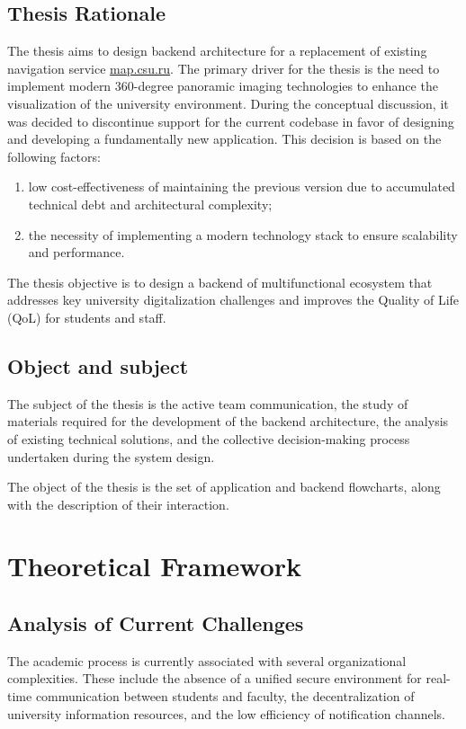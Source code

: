 \documentclass[a4paper, 14pt]{extreport}
\begin{document}
\section{Thesis Rationale}
The thesis aims to design backend architecture for a replacement of existing navigation service \href{https://map.csu.ru}{map.csu.ru}. The primary driver for the thesis is the need to implement modern 360-degree panoramic imaging technologies to enhance the visualization of the university environment. During the conceptual discussion, it was decided to discontinue support for the current codebase in favor of designing and developing a fundamentally new application. This decision is based on the following factors:
\begin{enumerate}
	\item low cost-effectiveness of maintaining the previous version due to accumulated technical debt and architectural complexity;
	\item the necessity of implementing a modern technology stack to ensure scalability and performance.
\end{enumerate}

The thesis objective is to design a backend of multifunctional ecosystem that addresses key university digitalization challenges and improves the Quality of Life (QoL) for students and staff. 

\section{Object and subject}

The subject of the thesis is the active team communication, the study of materials required for the development of the backend architecture, the analysis of existing technical solutions, and the collective decision-making process undertaken during the system design.

The object of the thesis is the set of application and backend flowcharts, along with the description of their interaction.

\chapter{Theoretical Framework}

\section{Analysis of Current Challenges}
The academic process is currently associated with several organizational complexities. These include the absence of a unified secure environment for real-time communication between students and faculty, the decentralization of university information resources, and the low efficiency of notification channels.
\end{document}
